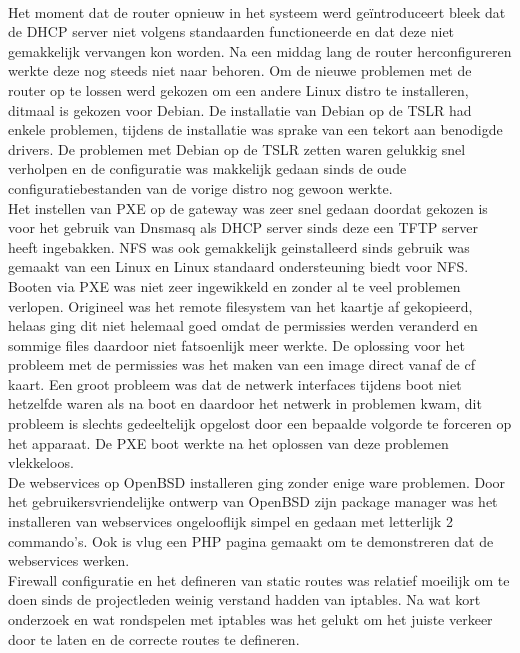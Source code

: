 \documentclass[12pt]{article}
\begin{document}
\\Het moment dat de router opnieuw in het systeem werd ge\"introduceert bleek dat de DHCP server niet volgens standaarden functioneerde en dat deze niet gemakkelijk vervangen kon worden. Na een middag lang de router herconfigureren werkte deze nog steeds niet naar behoren. Om de nieuwe problemen met de router op te lossen werd gekozen om een andere Linux distro te installeren, ditmaal is gekozen voor Debian. De installatie van Debian op de TSLR had enkele problemen, tijdens de installatie was sprake van een tekort aan benodigde drivers. De problemen met Debian op de TSLR zetten waren gelukkig snel verholpen en de configuratie was makkelijk gedaan sinds de oude configuratiebestanden van de vorige distro nog gewoon werkte.
\\Het instellen van PXE op de gateway was zeer snel gedaan doordat gekozen is voor het gebruik van Dnsmasq als DHCP server sinds deze een TFTP server heeft ingebakken. NFS was ook gemakkelijk geinstalleerd sinds gebruik was gemaakt van een Linux en Linux standaard ondersteuning biedt voor NFS.
\\Booten via PXE was niet zeer ingewikkeld en zonder al te veel problemen verlopen. Origineel was het remote filesystem van het kaartje af gekopieerd, helaas ging dit niet helemaal goed omdat de permissies werden veranderd en sommige files daardoor niet fatsoenlijk meer werkte. De oplossing voor het probleem met de permissies was het maken van een image direct vanaf de cf kaart. Een groot probleem was dat de netwerk interfaces tijdens boot niet hetzelfde waren als na boot en daardoor het netwerk in problemen kwam, dit probleem is slechts gedeeltelijk opgelost door een bepaalde volgorde te forceren op het apparaat. De PXE boot werkte na het oplossen van deze problemen vlekkeloos.
\\De webservices op OpenBSD installeren ging zonder enige ware problemen. Door het gebruikersvriendelijke ontwerp van OpenBSD zijn package manager was het installeren van webservices ongelooflijk simpel en gedaan met letterlijk 2 commando's. Ook is vlug een PHP pagina gemaakt om te demonstreren dat de webservices werken.
\\Firewall configuratie en het defineren van static routes was relatief moeilijk om te doen sinds de projectleden weinig verstand hadden van iptables. Na wat kort onderzoek en wat rondspelen met iptables was het gelukt om het juiste verkeer door te laten en de correcte routes te defineren.
\end{document}
